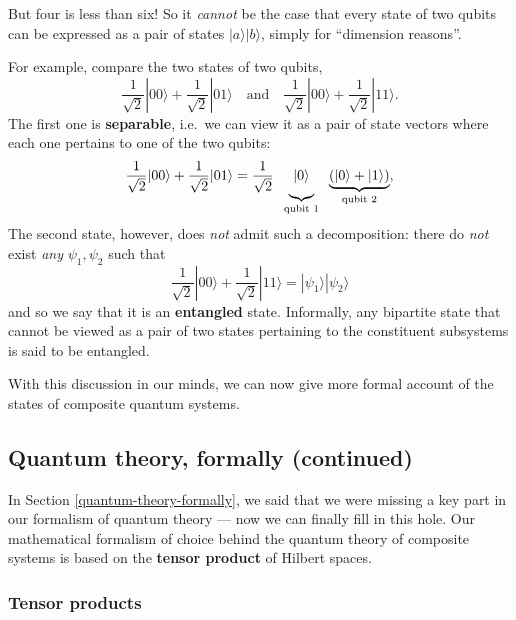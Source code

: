 \documentclass[fleqn,a4paper]{article}
\theoremstyle{definition}
\theoremstyle{definition}
\theoremstyle{definition}
\theoremstyle{definition}
\theoremstyle{remark}
\begin{document}
But four is less than six!
So it \emph{cannot} be the case that every state of two qubits can be expressed as a pair of states \(|a\rangle|b\rangle\), simply for ``dimension reasons''.

For example, compare the two states of two qubits,
\[
  \frac{1}{\sqrt{2}}|00\rangle + \frac{1}{\sqrt{2}}|01\rangle
  \quad\text{and}\quad
  \frac{1}{\sqrt{2}}|00\rangle + \frac{1}{\sqrt{2}}|11\rangle.
\]
The first one is \textbf{separable}, i.e.~we can view it as a pair of state vectors where each one pertains to one of the two qubits:
\[
  \frac{1}{\sqrt{2}}|00\rangle + \frac{1}{\sqrt{2}}|01\rangle
  = \frac{1}{\sqrt{2}}
  \;\;
  \underbrace{\vphantom{\frac{1}{\sqrt{2}}}|0\rangle}_{\text{qubit 1}}
  \;\;
  \underbrace{(|0\rangle+|1\rangle)}_{\text{qubit 2}},
\]
The second state, however, does \emph{not} admit such a decomposition: there do \emph{not} exist \emph{any} \(\psi_1,\psi_2\) such that
\[
  \frac{1}{\sqrt{2}}|00\rangle + \frac{1}{\sqrt{2}}|11\rangle
  = |\psi_1\rangle|\psi_2\rangle
\]
and so we say that it is an \textbf{entangled} state.
Informally, any bipartite state that cannot be viewed as a pair of two states pertaining to the constituent subsystems is said to be entangled.

With this discussion in our minds, we can now give more formal account of the states of composite quantum systems.

\hypertarget{tensor-products}{%
\subsection{Quantum theory, formally (continued)}\label{tensor-products}}

In Section \ref{quantum-theory-formally}, we said that we were missing a key part in our formalism of quantum theory --- now we can finally fill in this hole.
Our mathematical formalism of choice behind the quantum theory of composite systems is based on the \textbf{tensor product} of Hilbert spaces.

\hypertarget{tensor-products-1}{%
\subsubsection*{Tensor products}\label{tensor-products-1}}
\end{document}
